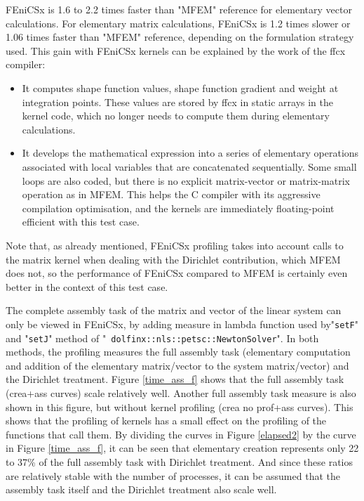 \documentclass[12pt]{article}
\newcommand{\f}[1]{FEniCSx#1}
\newcommand{\mycode}[1]{\textsf{"}\lstinline`#1`\textsf{"}}
\begin{document}
\f{} is 1.6 to 2.2 times faster than "{\color{MFEMGreen}MFEM}" reference for elementary vector calculations.
For elementary matrix calculations, \f{} is 1.2 times slower or 1.06 times faster than "{\color{MFEMGreen}MFEM}" reference, depending on the formulation strategy used.
This gain with \f{} kernels can be explained by the work of the ffcx compiler:
\begin{itemize}
	\item It computes shape function values, shape function gradient and weight at integration points. These values are stored by ffcx in static arrays in the kernel code, which no longer needs to compute them during elementary calculations.
	\item It develops the mathematical expression into a series of elementary operations associated with local variables that are concatenated sequentially.
	Some small loops are also coded, but there is no explicit matrix-vector or matrix-matrix operation as in MFEM.
	This helps the C compiler with its aggressive compilation optimisation, and the kernels are immediately floating-point efficient with this test case.	 
\end{itemize}
Note that, as already mentioned, \f{} profiling takes into account calls to the matrix kernel when dealing with the Dirichlet contribution, which MFEM does not, so the performance of \f{} compared to MFEM is certainly even better in the context of this test case. 



\bigskip
The complete assembly task of the matrix and vector of the linear system can only be viewed in \f{}, by adding measure in lambda function used by\mycode{setF} and \mycode{setJ} method of \mycode{ dolfinx::nls::petsc::NewtonSolver}.
In both methods, the profiling measures the full assembly task (elementary computation and addition of the elementary matrix/vector to the system matrix/vector) and the Dirichlet treatment.
Figure \ref{time_ass_f} shows that the full assembly task  (crea+ass curves) scale relatively well. 
Another full assembly task measure is also shown in this figure, but without kernel profiling (crea no prof+ass curves).
This shows that the profiling of kernels has a small effect on the profiling of the functions that call them.
 By dividing the curves in Figure \ref{elapsed2} by the curve in Figure \ref{time_ass_f}, it can be seen that elementary creation represents only 22 to 37\% of the full assembly task with Dirichlet treatment.
 And since these ratios are relatively stable with the number of processes, it can be assumed that the assembly task itself and the Dirichlet treatment also scale well.
\end{document}
